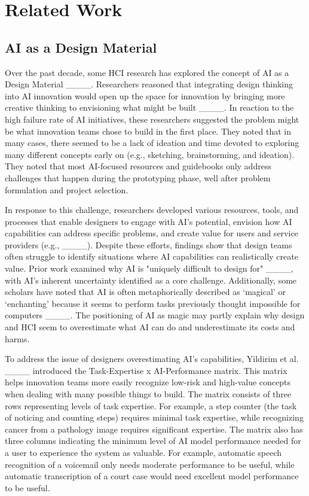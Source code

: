 \section{Related Work}
\subsection{AI as a Design Material}\label{subsec:AI_designmaterial}
Over the past decade, some HCI research has explored the concept of AI as a Design Material ____. Researchers reasoned that integrating design thinking into AI innovation would open up the space for innovation by bringing more creative thinking to envisioning what might be built ____. In reaction to the high failure rate of AI initiatives, these researchers suggested the problem might be what innovation teams chose to build in the first place. They noted that in many cases, there seemed to be a lack of ideation and time devoted to exploring many different concepts early on (e.g., sketching, brainstorming, and ideation). They noted that most AI-focused resources and guidebooks only address challenges that happen during the prototyping phase, well after problem formulation and project selection.

In response to this challenge, researchers developed various resources, tools, and processes that enable designers to engage with AI’s potential, envision how AI capabilities can address specific problems, and create value for users and service providers (e.g., ____). Despite these efforts, findings show that design teams often struggle to identify situations where AI capabilities can realistically create value. Prior work examined why AI is "uniquely difficult to design for" ____, with AI’s inherent uncertainty identified as a core challenge. Additionally, some scholars have noted that AI is often metaphorically described as `magical' or `enchanting' because it seems to perform tasks previously thought impossible for computers ____. The positioning of AI as magic may partly explain why design and HCI seem to overestimate what AI can do and underestimate its costs and harms.

To address the issue of designers overestimating AI's capabilities, Yildirim et al. ____ introduced the Task-Expertise x AI-Performance matrix. This matrix helps innovation teams more easily recognize low-risk and high-value concepts when dealing with many possible things to build. The matrix consists of three rows representing levels of task expertise. %
For example, a step counter (the task of noticing and counting steps) requires minimal task expertise, while recognizing cancer from a pathology image requires significant expertise. The matrix also has three columns indicating the minimum level of AI model performance needed for a user to experience the system as valuable. For example, automatic speech recognition of a voicemail only needs moderate performance to be useful, while automatic transcription of a court case would need excellent model performance to be useful. 

